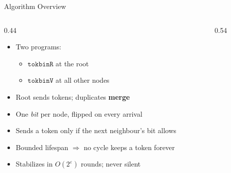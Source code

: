 \documentclass[aspectratio=169,11pt]{beamer}
\newcommand{\bodyfont}{\footnotesize}
\begin{document}
\begin{frame}{Algorithm Overview}
\vspace*{-3mm}
\begin{columns}[T]
\begin{column}{0.44\textwidth}
\bodyfont
\setlength{\leftmargini}{1.2em}
\setlength{\rightmargin}{-0.6em}
\begin{itemize}\setlength\itemsep{6pt}
\item Two programs:
  \begin{itemize}\setlength\itemsep{1pt}
  \item $\mathtt{tokbinR}$ at the root
  \item $\mathtt{tokbinV}$ at all other nodes
  \end{itemize}
\item Root sends tokens; duplicates \textbf{merge}
\item One \emph{bit} per node, flipped on every arrival
\item Sends a token only if the next neighbour's bit allows
\item Bounded lifespan $\Rightarrow$ no cycle keeps a token forever
\item Stabilizes in $O(2^{\varepsilon})$ rounds; never silent
\end{itemize}
\end{column}
\begin{column}{0.54\textwidth}
\centering
\end{column}
\end{columns}
\end{frame}
\end{document}
